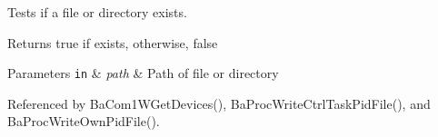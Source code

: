 Tests if a file or directory exists. 

\begin{DoxyReturn}{Returns}
true if exists, otherwise, false 
\end{DoxyReturn}

\begin{DoxyParams}[1]{Parameters}
\mbox{\tt in}  & {\em path} & Path of file or directory \\
\hline
\end{DoxyParams}


Referenced by Ba\+Com1\+W\+Get\+Devices(), Ba\+Proc\+Write\+Ctrl\+Task\+Pid\+File(), and Ba\+Proc\+Write\+Own\+Pid\+File().

